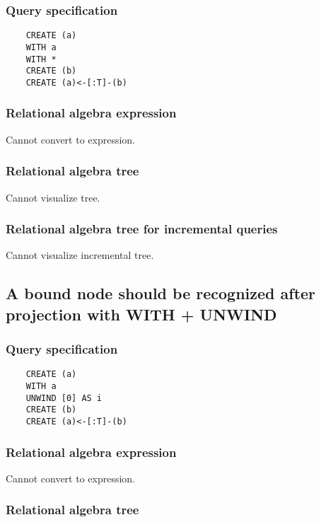 	\subsubsection*{Query specification}

	\begin{lstlisting}
	CREATE (a)
	WITH a
	WITH *
	CREATE (b)
	CREATE (a)<-[:T]-(b)
	\end{lstlisting}


	\subsubsection*{Relational algebra expression}

	Cannot convert to expression.

	\subsubsection*{Relational algebra tree}

	Cannot visualize tree.

	\subsubsection*{Relational algebra tree for incremental queries}

	Cannot visualize incremental tree.
	\subsection{A bound node should be recognized after projection with WITH + UNWIND}

	\subsubsection*{Query specification}

	\begin{lstlisting}
	CREATE (a)
	WITH a
	UNWIND [0] AS i
	CREATE (b)
	CREATE (a)<-[:T]-(b)
	\end{lstlisting}


	\subsubsection*{Relational algebra expression}

	Cannot convert to expression.

	\subsubsection*{Relational algebra tree}

